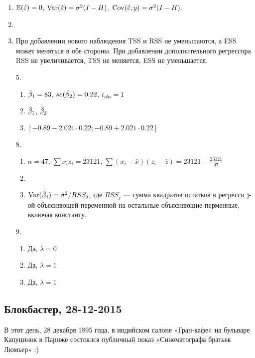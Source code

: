 \documentclass[12pt, a4paper]{article}\usepackage[]{graphicx}\usepackage[]{color}
\begin{document}
\begin{enumerate}
\item $\mathbb{E}(\hat\varepsilon) = 0$, $\operatorname{Var}(\hat\varepsilon) = \sigma^2 (I - H)$, $\operatorname{Cov}(\hat\varepsilon, y) =  \sigma^2 (I - H)$.
\item
\item При добавлении нового наблюдения TSS и RSS не уменьшаются, а ESS может меняться в обе стороны.
При добавлении дополнительного регрессора RSS не увеличивается, TSS не меняется, ESS не уменьшается.
\item[5.]
\begin{enumerate}
\item $\hat{\beta}_1 = 83$, $se(\hat{\beta}_2) = 0.22$, $t_{obs} = 1$
\item $\hat{\beta}_1$, $\hat{\beta}_2$
\item $[-0.89  - 2.021 \cdot 0.22; -0.89 + 2.021 \cdot 0.22]$
\end{enumerate}
\item[8.]
\begin{enumerate}
\item $n=47$, $\sum x_iz_i = 23121$, $\sum(x_i-\bar{x})(z_i-\bar{z}) = 23121 - \frac{23121}{47}$
\item
\item $\operatorname{Var}(\hat{\beta}_j) = \sigma^2/RSS_j$, где $RSS_j$ — сумма квадратов остатков в регресси j-ой объясняющей переменной на остальные объясняющие перменные, включая константу.
\end{enumerate}
\item[9.]
\begin{enumerate}
\item Да, $\lambda=0$
\item Да, $\lambda=1$
\item Да, $\lambda=1$
\end{enumerate}
\end{enumerate}

\subsection{Блокбастер, 28-12-2015}

В этот день, 28 декабря 1895 года, в индийском салоне «Гран-кафе» на бульваре Капуцинок в Париже состоялся публичный показ «Синематографа братьев Люмьер» :)
\end{document}
